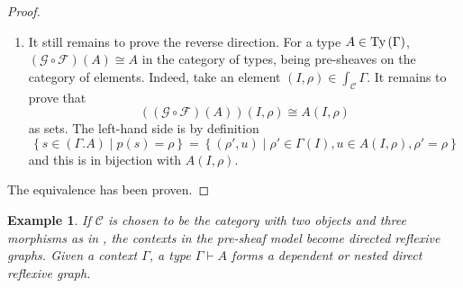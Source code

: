 \documentclass[12pt,a4paper,twoside,xetex]{book} %
\newtheorem{example}[theorem]{Example}
\begin{document}
\begin{proof}
\begin{enumerate}
\item It still remains to prove the reverse direction. For a type $A \in 
\text{Ty}\left(\Gamma\right)$, $(\mathcal{G} \circ \mathcal{F}) (A ) 
\cong A$ in the category of types, being pre-sheaves on the category of 
elements. Indeed, take an element $(I,\rho) \in \int_{\mathcal{C}} \Gamma$. It 
remains to prove that  $$((\mathcal{G} \circ \mathcal{F}) (A )) (I,\rho) \cong 
A(I,\rho) $$ as sets. The left-hand side is by definition $$\left\{ s \in 
(\Gamma . A) \mid p(s) = \rho \right\} = \left\{ (\rho ', u) \mid \rho ' \in 
\Gamma (I), u \in A(I,\rho), \rho ' = \rho \right\}$$ and this is in bijection 
with  $A(I,\rho)$. 
\end{enumerate}
The equivalence has been proven.
\end{proof}

\begin{example}
If $\mathcal{C}$ is chosen to be the category with two 
objects and three morphisms as in , the contexts in the pre-sheaf model become directed reflexive graphs. Given a 
context $\Gamma$, a type $\Gamma \vdash A$ forms a dependent or nested direct reflexive graph. 
 
\end{example}
\end{document}
